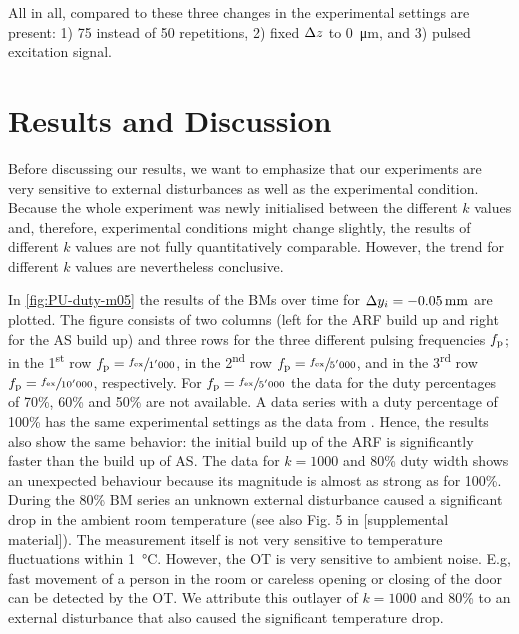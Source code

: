 All in all, compared to \cite{Goering2021} these three changes in the 
experimental settings are present: 1) 75 instead of 50 repetitions, 2) fixed 
$\Delta z$ to \SI{0}{\um}, and 3) pulsed excitation signal.

\section{Results and Discussion}

Before discussing our results, we want to emphasize that our experiments are 
very sensitive to external disturbances as well as the experimental condition. 
Because the whole experiment was newly initialised between the different $k$ 
values and, therefore, experimental conditions might change slightly, the 
results of different $k$ values are not fully quantitatively comparable.  
However, the trend for different $k$ values are nevertheless conclusive.

In \cref{fig:PU-duty-m05} the results of the BMs over time for $\Dy_{i}= 
\SI{-0.05}{\mm}$ are plotted. The figure consists of two columns (left for the 
ARF build up and right for the AS build up) and three rows for the three 
different pulsing frequencies $f_{\mathrm{p}}$; in the 1\textsuperscript{st} row 
$f_{\mathrm{p}}=\sfrac{f_{\mathrm{ex}}}{1'000}$, in the 2\textsuperscript{nd} row 
$f_{\mathrm{p}}=\sfrac{f_{\mathrm{ex}}}{5'000}$, and in the 3\textsuperscript{rd} row 
$f_{\mathrm{p}}=\sfrac{f_{\mathrm{ex}}}{10'000}$, respectively. For $f_{\mathrm{p}}=\sfrac{f_{\mathrm{ex}}}{5'000}$ the 
data for the duty percentages of 70\%, 60\% and 50\% are not available. A data 
series with a duty percentage of 100\% has the same experimental settings as 
the data from \cite{Goering2021}. Hence, the results also show the same 
behavior: the initial build up of the ARF is significantly faster than the 
build up of AS. The data for $k=1000$ and 80\% duty width shows an unexpected 
behaviour because its magnitude is almost as strong as for 100\%. During the 
80\% BM series an unknown external disturbance caused a significant drop in the 
ambient room temperature (see also Fig. 5 in [supplemental material]). The 
measurement itself is not very sensitive to temperature fluctuations within 
\SI{1}{\degreeCelsius}. However, the OT is very sensitive to ambient noise. 
E.g, fast movement of a person in the room or careless opening or closing of 
the door can be detected by the OT. We attribute this outlayer of $k=1000$ and 
80\% to an external disturbance that also caused the significant temperature 
drop.

